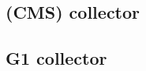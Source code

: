 \documentclass[
  digital, %
  oneside,
  notable, %
  nolof,     %
  nolot     %
]{fithesis3}
\begin{document}
\subsection{(CMS) collector}
\subsection{G1 collector}
\end{document}
